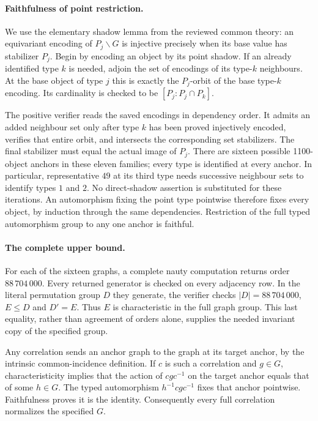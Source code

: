 \documentclass[11pt]{article}
\begin{document}
\paragraph{Faithfulness of point restriction.}
We use the elementary shadow lemma from the reviewed common theory:
an equivariant encoding of $P_j\backslash G$ is injective precisely
when its base value has stabilizer $P_j$. Begin by encoding an object
by its point shadow. If an already identified type $k$ is needed,
adjoin the set of encodings of its type-$k$ neighbours. At the base
object of type $j$ this is exactly the $P_j$-orbit of the base
type-$k$ encoding. Its cardinality is checked to be
$[P_j:P_j\cap P_k]$.

The positive verifier reads the saved encodings in dependency order.
It admits an added neighbour set only after type $k$ has been proved
injectively encoded, verifies that entire orbit, and intersects the
corresponding set stabilizers. The final stabilizer must equal the
actual image of $P_j$. There are sixteen possible 1100-object anchors
in these eleven families; every type is identified at every anchor.
In particular, representative $49$ at its third type needs successive
neighbour sets to identify types $1$ and $2$. No direct-shadow assertion is
substituted for these iterations.
An automorphism fixing the point type pointwise therefore fixes every
object, by induction through the same dependencies. Restriction of
the full typed automorphism group to any one anchor is faithful.

\paragraph{The complete upper bound.}
For each of the sixteen graphs, a complete nauty computation returns
order $88\,704\,000$. Every returned generator is checked on every
adjacency row. In the literal permutation group $D$ they generate,
the verifier checks $|D|=88\,704\,000$, $E\leq D$ and $D'=E$.
Thus $E$ is characteristic in the full graph group. This last equality,
rather than agreement of orders alone, supplies the needed invariant
copy of the specified group.

Any correlation sends an anchor graph to the graph at its target
anchor, by the intrinsic common-incidence definition. If $c$ is such
a correlation and $g\in G$, characteristicity implies that the action
of $cgc^{-1}$ on the target anchor equals that of some $h\in G$.
The typed automorphism $h^{-1}cgc^{-1}$ fixes that anchor pointwise.
Faithfulness proves it is the identity. Consequently every full
correlation normalizes the specified $G$.
\end{document}
